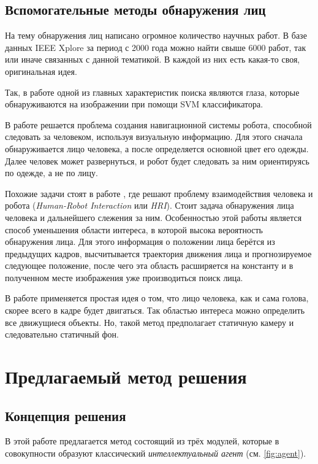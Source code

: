 \documentclass[12pt]{report}
\begin{document}
\section{Вспомогательные методы обнаружения лиц}

На тему обнаружения лиц написано огромное количество научных работ. В базе данных IEEE Xplore за период с 2000 года 
можно найти свыше 6000 работ, так или иначе связанных с данной тематикой. В каждой из них есть какая-то своя, 
оригинальная идея.

Так, в работе \citep{jee2004eye} одной из главных характеристик поиска являются глаза, которые обнаруживаются на 
изображении при помощи SVM классификатора.

В работе \citep{capi2010vision} решается проблема создания навигационной системы робота, способной следовать за 
человеком, используя визуальную информацию. Для этого сначала обнаруживается лицо человека, а после определяется 
основной цвет его одежды. Далее человек может развернуться, и робот будет следовать за ним ориентируясь по одежде, 
а не по лицу.

Похожие задачи стоят в работе \citep{luo2007face}, где решают проблему взаимодействия человека и робота (\textit
{Human-Robot Interaction} или \textit{HRI}). Стоит задача обнаружения лица человека и дальнейшего слежения за ним. 
Особенностью этой работы является способ уменьшения области интереса, в которой высока вероятность обнаружения 
лица. 
Для этого информация о положении лица берётся из предыдущих кадров, высчитывается траектория движения лица и 
прогнозируемое следующее положение, после чего эта область расширяется на константу и в полученном месте 
изображения 
уже производиться поиск лица.

В работе \citep{zhang2010fast} применяется простая идея о том, что лицо человека, как и сама голова, скорее всего в 
кадре будет двигаться. Так областью интереса можно определить все движущиеся объекты. Но, такой метод предполагает 
статичную камеру и следовательно статичный фон.


\chapter{Предлагаемый метод решения}
\thispagestyle{fancy}
\section{Концепция решения}
В этой работе предлагается метод состоящий из трёх модулей, которые в совокупности образуют классический \emph
{интеллектуальный агент} (см. \ref{fig:agent}). 
\end{document}
